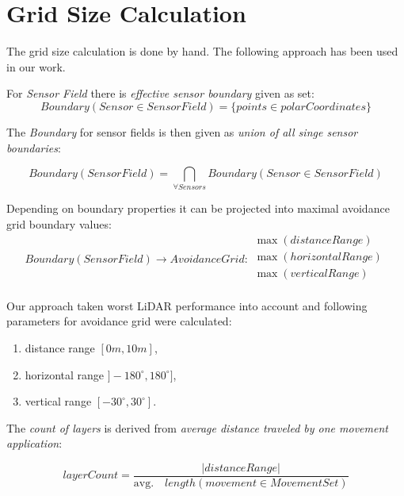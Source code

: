 \chapter{Grid Size Calculation}\label{app:gridSizeCalculation}

\noindent The grid size calculation is done by hand. The following approach has been used in our work. 

For \emph{Sensor Field} there is \emph{effective sensor boundary} given as set:
\begin{equation}
    Boundary(Sensor \in Sensor Field) = \{points \in polarCoordinates\}
\end{equation}

\noindent The \emph{Boundary} for sensor fields is then given as \emph{union of all singe sensor boundaries}:

\begin{equation}
     Boundary(Sensor Field) = \bigcap_{\forall Sensors} Boundary(Sensor \in Sensor Field)
\end{equation}

\noindent Depending on boundary properties it can be projected into maximal avoidance grid boundary values:
\begin{equation}
    Boundary(Sensor Field) \to Avoidance Grid : 
    \begin{gathered}
        \max(distanceRange)\\
        \max(horizontalRange)\\
        \max(verticalRange)\\
    \end{gathered}
\end{equation}

\noindent Our approach taken worst LiDAR performance into account \cite{sabatini2014lidar} and following parameters for avoidance grid were calculated:

\begin{enumerate}
    \item distance range $[0m,10m]$,
    \item horizontal range $]-180^\circ,180^\circ]$,
    \item vertical range $[-30^\circ,30^\circ]$.
\end{enumerate}

\noindent The \emph{count of layers} is derived from \emph{average distance traveled by one movement application}:

\begin{equation}
    layer Count = \frac{|distance Range|}{\text{avg.}\quad length(movement\in Movement Set)}
\end{equation}

